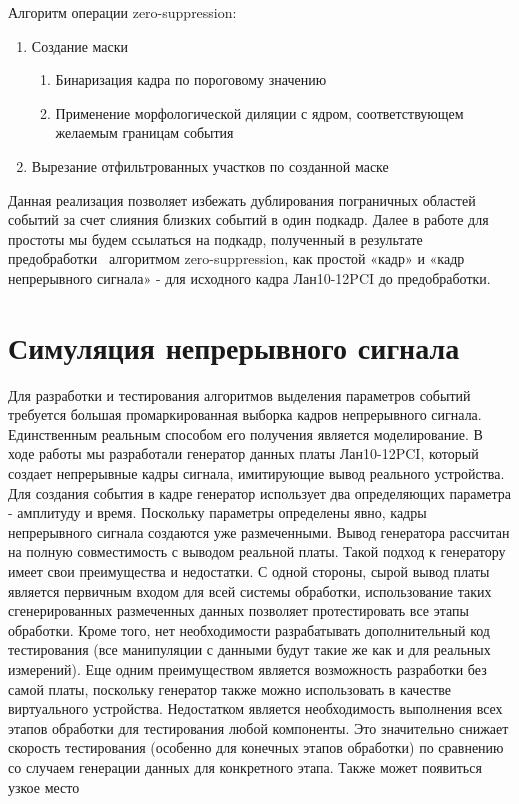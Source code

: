 \documentclass[a4paper,14pt]{extreport}
\begin{document}
Алгоритм операции zero-suppression:
\begin{enumerate}
    \item Создание маски
    \begin{enumerate}
        \item Бинаризация кадра по пороговому значению
        \item Применение морфологической диляции с ядром, соответствующем желаемым границам события
    \end{enumerate}
    \item Вырезание отфильтрованных участков по созданной маске
\end{enumerate}

Данная реализация позволяет избежать дублирования пограничных областей событий за счет слияния близких событий в один подкадр. Далее в работе для простоты мы будем ссылаться на подкадр, полученный в результате предобработки ~алгоритмом zero-suppression, как простой «кадр» и «кадр непрерывного сигнала» - для исходного кадра Лан10-12PCI до предобработки.

\section{Симуляция непрерывного сигнала}

Для разработки и тестирования алгоритмов выделения параметров событий требуется большая промаркированная выборка кадров непрерывного сигнала. Единственным реальным способом его получения является моделирование. В ходе работы мы разработали генератор данных платы Лан10-12PCI, который создает непрерывные кадры сигнала, имитирующие вывод реального устройства. Для создания события в кадре генератор использует два определяющих параметра - амплитуду и время. Поскольку параметры определены явно, кадры непрерывного сигнала создаются уже размеченными. Вывод генератора рассчитан на полную совместимость с выводом реальной платы. Такой подход к генератору имеет свои преимущества и недостатки. С одной стороны, сырой вывод платы является первичным входом для всей системы обработки, использование таких сгенерированных размеченных данных позволяет протестировать все этапы обработки. Кроме того, нет необходимости разрабатывать дополнительный код тестирования (все манипуляции с данными будут такие же как и для реальных измерений). Еще одним преимуществом является возможность разработки без самой платы, поскольку генератор также можно использовать в качестве виртуального устройства. Недостатком является необходимость выполнения всех этапов обработки для тестирования любой компоненты. Это значительно снижает скорость тестирования (особенно для конечных этапов обработки) по сравнению со случаем генерации данных для конкретного этапа. Также может появиться узкое место
\end{document}
